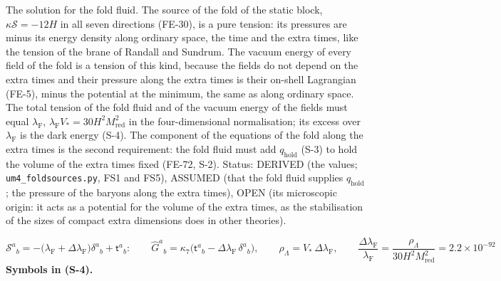 \documentclass[
  10pt,
]{article}
\begin{document}
The solution for the fold fluid. The source of the fold of the static
block, \(\kappa\mathcal{S} = -12H\) in all seven directions (FE-30), is
a pure tension: its pressures are minus its energy density along
ordinary space, the time and the extra times, like the tension of the
brane of Randall and Sundrum. The vacuum energy of every field of the
fold is a tension of this kind, because the fields do not depend on the
extra times and their pressure along the extra times is their on-shell
Lagrangian (FE-5), minus the potential at the minimum, the same as along
ordinary space. The total tension of the fold fluid and of the vacuum
energy of the fields must equal \(\lambda_{\mathrm{F}}\),
\(\lambda_{\mathrm{F}}V_* = 30H^2M_{\mathrm{red}}^2\) in the
four-dimensional normalisation; its excess over \(\lambda_{\mathrm{F}}\)
is the dark energy (S-4). The component of the equations of the fold
along the extra times is the second requirement: the fold fluid must add
\(q_{\mathrm{hold}}\) (S-3) to hold the volume of the extra times fixed
(FE-72, S-2). Status: DERIVED (the values; \texttt{um4\_foldsources.py},
FS1 and FS5), ASSUMED (that the fold fluid supplies
\(q_{\mathrm{hold}}\); the pressure of the baryons along the extra
times), OPEN (its microscopic origin: it acts as a potential for the
volume of the extra times, as the stabilisation of the sizes of compact
extra dimensions does in other theories).

\[
\mathcal{S}^a{}_b = -\big(\lambda_{\mathrm{F}} + \Delta\lambda_{\mathrm{F}}\big)\delta^a{}_b + \mathsf{t}^a{}_b:\qquad
\hat G^a{}_b = \kappa_7\big(\mathsf{t}^a{}_b - \Delta\lambda_{\mathrm{F}}\,\delta^a{}_b\big),\qquad
\rho_\Lambda = V_*\,\Delta\lambda_{\mathrm{F}},\qquad
\frac{\Delta\lambda_{\mathrm{F}}}{\lambda_{\mathrm{F}}} = \frac{\rho_\Lambda}{30H^2M_{\mathrm{red}}^2} = 2.2\times10^{-92} \tag{S-4}
\] \textbf{Symbols in (S-4).}
\end{document}
